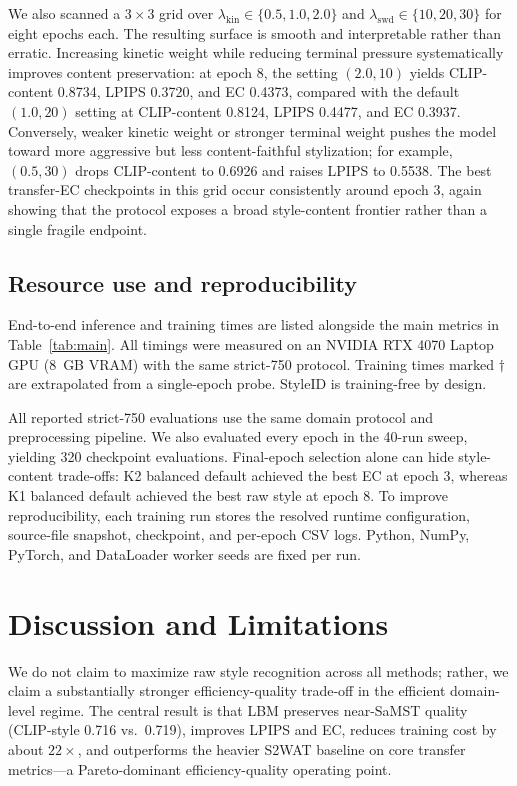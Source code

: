 ﻿\documentclass[letterpaper]{article}
\begin{document}
We also scanned a $3 \times 3$ grid over $\lambda_{\mathrm{kin}} \in \{0.5, 1.0, 2.0\}$ and $\lambda_{\mathrm{swd}} \in \{10, 20, 30\}$ for eight epochs each. The resulting surface is smooth and interpretable rather than erratic. Increasing kinetic weight while reducing terminal pressure systematically improves content preservation: at epoch 8, the setting $(2.0, 10)$ yields CLIP-content 0.8734, LPIPS 0.3720, and EC 0.4373, compared with the default $(1.0, 20)$ setting at CLIP-content 0.8124, LPIPS 0.4477, and EC 0.3937. Conversely, weaker kinetic weight or stronger terminal weight pushes the model toward more aggressive but less content-faithful stylization; for example, $(0.5, 30)$ drops CLIP-content to 0.6926 and raises LPIPS to 0.5538. The best transfer-EC checkpoints in this grid occur consistently around epoch 3, again showing that the protocol exposes a broad style-content frontier rather than a single fragile endpoint.

\subsection{Resource use and reproducibility}
End-to-end inference and training times are listed alongside the main metrics in Table~\ref{tab:main}. All timings were measured on an NVIDIA RTX 4070 Laptop GPU (8~GB VRAM) with the same strict-750 protocol. Training times marked $\dagger$ are extrapolated from a single-epoch probe. StyleID is training-free by design.

All reported strict-750 evaluations use the same domain protocol and preprocessing pipeline. We also evaluated every epoch in the 40-run sweep, yielding 320 checkpoint evaluations. Final-epoch selection alone can hide style-content trade-offs: K2 balanced default achieved the best EC at epoch 3, whereas K1 balanced default achieved the best raw style at epoch 8. To improve reproducibility, each training run stores the resolved runtime configuration, source-file snapshot, checkpoint, and per-epoch CSV logs. Python, NumPy, PyTorch, and DataLoader worker seeds are fixed per run.



\section{Discussion and Limitations}
We do not claim to maximize raw style recognition across all methods; rather, we claim a substantially stronger efficiency-quality trade-off in the efficient domain-level regime. The central result is that LBM preserves near-SaMST quality (CLIP-style 0.716 vs.\ 0.719), improves LPIPS and EC, reduces training cost by about $22\times$, and outperforms the heavier S2WAT baseline on core transfer metrics---a Pareto-dominant efficiency-quality operating point.
\end{document}
